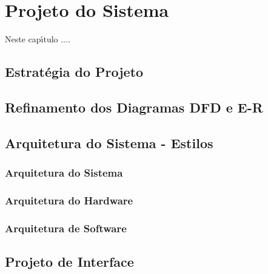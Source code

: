 
\chapter{Projeto do Sistema}

Neste cap\'{\i}tulo ....


\section{Estrat\'{e}gia do Projeto}


\section{Refinamento dos Diagramas DFD e E-R}


\section{Arquitetura do Sistema - Estilos}



    \subsection{Arquitetura do Sistema}
    
    
    
    \subsection{Arquitetura do Hardware}
    
    
    \subsection{Arquitetura de Software}
    

\section{Projeto de Interface}



